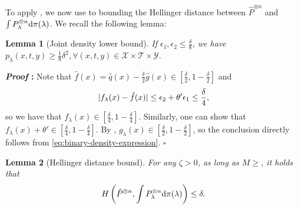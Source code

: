 \documentclass{article}
\def\eps{{\epsilon}}
\def\gT{{\mathcal{T}}}
\def\gX{{\mathcal{X}}}
\def\gY{{\mathcal{Y}}}
\newcommand{\dd}{\textup{d}}
\newtheorem{lemma}{Lemma}[section]
\renewenvironment{proof}{\noindent\textbf{\textit{Proof }:}}{\hfill$\square$}
\begin{document}
To apply  , we now use  to bounding the Hellinger distance between $\hat{P}^{\otimes n}$ and $\int P_{\lambda}^{\otimes n} \dd \pi(\lambda)$. We recall the following lemma:

\begin{lemma}[Joint density lower bound]
    \label{lemma:joint-density-lower-bound}
    If $\eps_1,\eps_2\leq\frac{\delta}{8}$, we have $p_{\lambda}(x,t,y) \geq \frac{1}{8}\delta^2, \forall (x,t,y)\in\gX\times\gT\times\gY$. 
\end{lemma}

\begin{proof}
    Note that $\hat{f}(x)=\hat{q}(x)-\frac{\delta}{2}\hat{g}(x)\in\left[\frac{\delta}{2},1-\frac{\delta}{2}\right]$ and 
    \begin{equation}
        \notag
        |f_{\lambda}(x)-\hat{f}(x)| \leq \eps_2 + \theta'\eps_1 \leq \frac{\delta}{4},
    \end{equation}
    so we have that $f_{\lambda}(x)\in\left[\frac{\delta}{4},1-\frac{\delta}{4}\right]$. Similarly, one can show that $f_{\lambda}(x)+\theta'\in\left[\frac{\delta}{4},1-\frac{\delta}{4}\right]$. By  , $g_{\lambda}(x)\in\left[\frac{\delta}{2},1-\frac{\delta}{2}\right]$, so the conclusion directly follows from \eqref{eq:binary-density-expression}.
\end{proof}

\begin{lemma}[Hellinger distance bound]
    \label{lemma:hellinger-bound}
    For any $\zeta>0$, as long as $M \geq $, it holds that
    \begin{equation}
        \notag
        H\left(\hat{P}^{\otimes n}, \int P_{\lambda}^{\otimes n} \dd \pi(\lambda)\right) \leq \delta.
    \end{equation}
\end{lemma}
\end{document}
